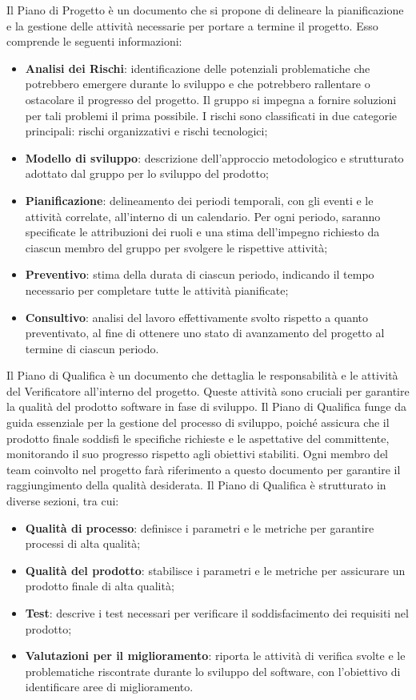 Il Piano di Progetto è un documento che si propone di delineare la pianificazione e la gestione delle attività necessarie per portare a termine il progetto.
Esso comprende le seguenti informazioni:
\begin{itemize}
	\item \textbf{Analisi dei Rischi}: identificazione delle potenziali problematiche che potrebbero emergere durante lo sviluppo e che potrebbero rallentare o ostacolare il progresso del progetto. Il gruppo si impegna a fornire soluzioni per tali problemi il prima possibile. I rischi sono classificati in due categorie principali: rischi organizzativi e rischi tecnologici;
	\item \textbf{Modello di sviluppo}: descrizione dell'approccio metodologico e strutturato adottato dal gruppo per lo sviluppo del prodotto;
	\item \textbf{Pianificazione}: delineamento dei periodi temporali, con gli eventi e le attività correlate, all'interno di un calendario. Per ogni periodo, saranno specificate le attribuzioni dei ruoli e una stima dell'impegno richiesto da ciascun membro del gruppo per svolgere le rispettive attività;
	\item \textbf{Preventivo}: stima della durata di ciascun periodo, indicando il tempo necessario per completare tutte le attività pianificate;
	\item \textbf{Consultivo}: analisi del lavoro effettivamente svolto rispetto a quanto preventivato, al fine di ottenere uno stato di avanzamento del progetto al termine di ciascun periodo.
\end{itemize}

Il Piano di Qualifica è un documento che dettaglia le responsabilità e le attività del Verificatore all'interno del progetto.
Queste attività sono cruciali per garantire la qualità del prodotto software in fase di sviluppo.
Il Piano di Qualifica funge da guida essenziale per la gestione del processo di sviluppo, poiché assicura che il prodotto finale soddisfi le specifiche richieste e le aspettative del committente, monitorando il suo progresso rispetto agli obiettivi stabiliti.
Ogni membro del team coinvolto nel progetto farà riferimento a questo documento per garantire il raggiungimento della qualità desiderata.
Il Piano di Qualifica è strutturato in diverse sezioni, tra cui:
\begin{itemize}
	\item \textbf{Qualità di processo}: definisce i parametri e le metriche per garantire processi di alta qualità;
	\item \textbf{Qualità del prodotto}: stabilisce i parametri e le metriche per assicurare un prodotto finale di alta qualità;
	\item \textbf{Test}: descrive i test necessari per verificare il soddisfacimento dei requisiti nel prodotto;
	\item \textbf{Valutazioni per il miglioramento}: riporta le attività di verifica svolte e le problematiche riscontrate durante lo sviluppo del software, con l'obiettivo di identificare aree di miglioramento.
\end{itemize}


